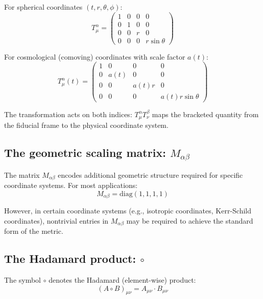 \documentclass[11pt,a4paper]{article}
\theoremstyle{definition}
\theoremstyle{remark}
\begin{document}
	For spherical coordinates $(t, r, \theta, \phi)$:
	\begin{equation}
		T^\alpha_\mu = \begin{pmatrix} 1 & 0 & 0 & 0 \\ 0 & 1 & 0 & 0 \\ 0 & 0 & r & 0 \\ 0 & 0 & 0 & r\sin\theta \end{pmatrix}
		\label{eq:spherical_transform}
	\end{equation}
	
	For cosmological (comoving) coordinates with scale factor $a(t)$:
	\begin{equation}
		T^\alpha_\mu(t) = \begin{pmatrix} 1 & 0 & 0 & 0 \\ 0 & a(t) & 0 & 0 \\ 0 & 0 & a(t)r & 0 \\ 0 & 0 & 0 & a(t)r\sin\theta \end{pmatrix}
		\label{eq:cosmological_transform}
	\end{equation}
	
	The transformation acts on both indices: $T^\alpha_\mu T^\beta_\nu$ maps the bracketed quantity from the fiducial frame to the physical coordinate system.
	
	\subsection{The geometric scaling matrix: $M_{\alpha\beta}$}
	
	The matrix $M_{\alpha\beta}$ encodes additional geometric structure required for specific coordinate systems. For most applications:
	\begin{equation}
		M_{\alpha\beta} = \text{diag}(1, 1, 1, 1)
		\label{eq:identity_scaling}
	\end{equation}
	
	However, in certain coordinate systems (e.g., isotropic coordinates, Kerr-Schild coordinates), nontrivial entries in $M_{\alpha\beta}$ may be required to achieve the standard form of the metric.
	
	\subsection{The Hadamard product: $\circ$}
	
	The symbol $\circ$ denotes the Hadamard (element-wise) product:
	\begin{equation}
		(A \circ B)_{\mu\nu} = A_{\mu\nu} \cdot B_{\mu\nu}
		\label{eq:hadamard}
	\end{equation}
	
\end{document}
